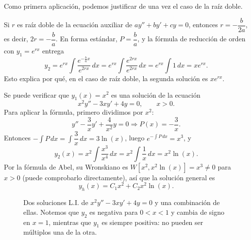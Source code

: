 Como primera aplicaci\'on, podemos justificar de una vez el caso de la ra\'iz doble.

\begin{example}
    Si $r$ es ra\'iz doble de la ecuaci\'on auxiliar de $ay''+by'+cy=0$, entonces $r=-\dfrac{b}{2a}$, es decir, $2r=-\dfrac{b}{a}$. En forma est\'andar, $P=\dfrac{b}{a}$, y la f\'ormula de reducci\'on de orden con $y_1=e^{rx}$ entrega
    \[
    y_2=e^{rx}\int\dfrac{e^{-\frac{b}{a}x}}{e^{2rx}}\,dx=e^{rx}\int\dfrac{e^{2rx}}{e^{2rx}}\,dx=e^{rx}\int1\,dx=xe^{rx}.
    \]
    Esto explica por qu\'e, en el caso de ra\'iz doble, la segunda soluci\'on es $xe^{rx}$.
\end{example}

\begin{example}
    Se puede verificar que $y_1(x)=x^2$ es una soluci\'on de la ecuaci\'on
    \[
    x^2y''-3xy'+4y=0,\qquad x>0.
    \]
    Para aplicar la f\'ormula, primero dividimos por $x^2$:
    \[
    y''-\dfrac{3}{x}y'+\dfrac{4}{x^2}y=0\Longrightarrow P(x)=-\dfrac{3}{x}.
    \]
    Entonces $-\int P\,dx=\int\dfrac{3}{x}\,dx=3\ln(x)$, luego $e^{-\int P\,dx}=x^3$, y
    \[
    y_2(x)=x^2\int\dfrac{x^3}{x^4}\,dx=x^2\int\dfrac{1}{x}\,dx=x^2\ln(x).
    \]
    Por la f\'ormula de Abel, su Wronskiano es $W[x^2,x^2\ln(x)]=x^3\neq0$ para $x>0$ (puede comprobarlo directamente), as\'i que la soluci\'on general es
    \[
    y_h(x)=C_1x^2+C_2x^2\ln(x).
    \]
\end{example}

\begin{figure}[h!]
    \centering
    \caption{Dos soluciones L.I. de $x^2y''-3xy'+4y=0$ y una combinaci\'on de ellas. Notemos que $y_2$ es negativa para $0<x<1$ y cambia de signo en $x=1$, mientras que $y_1$ es siempre positiva: no pueden ser m\'ultiplos una de la otra.}
    \label{fig:reduccion_euler}
\end{figure}

